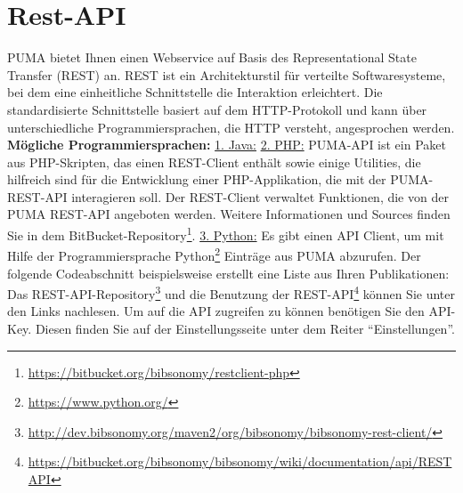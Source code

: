 \section{Rest-API}
\label{sec:restApi}
PUMA bietet Ihnen einen Webservice auf Basis des Representational State Transfer (REST) an. \newline
REST ist ein Architekturstil für verteilte Softwaresysteme, bei dem eine einheitliche Schnittstelle die Interaktion erleichtert. Die standardisierte Schnittstelle basiert auf dem HTTP-Protokoll und kann über unterschiedliche Programmiersprachen, die HTTP versteht, angesprochen werden.\newline\newline
\textbf{Mögliche Programmiersprachen:}\newline\newline
\underline{1. Java:}   \newline\newline 
\underline{2. PHP:}\newline
PUMA-API ist ein Paket aus PHP-Skripten, das einen REST-Client enthält sowie einige Utilities, die hilfreich sind für die Entwicklung einer PHP-Applikation, die mit der PUMA-REST-API interagieren soll. Der REST-Client verwaltet Funktionen, die von der PUMA REST-API angeboten werden.
\newline
Weitere Informationen und Sources finden Sie in dem BitBucket-Repository\footnote{\url{https://bitbucket.org/bibsonomy/restclient-php}}.  
\newline\newline
\underline{3. Python:}\newline
Es gibt einen API Client, um mit Hilfe der Programmiersprache Python\footnote{\url{https://www.python.org/}} Einträge aus PUMA abzurufen. Der folgende Codeabschnitt beispielsweise erstellt eine Liste aus Ihren Publikationen:\newline\newline
Das REST-API-Repository\footnote{\url{http://dev.bibsonomy.org/maven2/org/bibsonomy/bibsonomy-rest-client/}} und die Benutzung der REST-API\footnote{\url{https://bitbucket.org/bibsonomy/bibsonomy/wiki/documentation/api/REST API}} können Sie unter den Links nachlesen.
\newline
Um auf die API zugreifen zu können benötigen Sie den API-Key. Diesen finden Sie auf der Einstellungsseite unter dem Reiter \enquote{Einstellungen}. 






